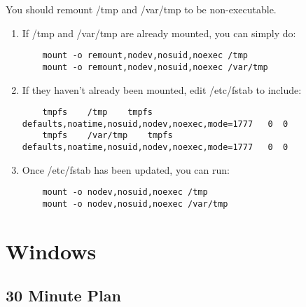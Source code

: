\documentclass[12pt,letterpaper]{article}
\begin{document}
You should remount /tmp and /var/tmp to be non-executable.
\begin{enumerate}
	\item If /tmp and /var/tmp are already mounted, you can simply do:
	\begin{verbatim}
	mount -o remount,nodev,nosuid,noexec /tmp
	mount -o remount,nodev,nosuid,noexec /var/tmp
	\end{verbatim}
	\item If they haven't already been mounted, edit /etc/fstab to include:
	\begin{verbatim}
	tmpfs    /tmp    tmpfs    defaults,noatime,nosuid,nodev,noexec,mode=1777   0  0
	tmpfs    /var/tmp    tmpfs    defaults,noatime,nosuid,nodev,noexec,mode=1777   0  0
	\end{verbatim}
	\item Once /etc/fstab has been updated, you can run:
	\begin{verbatim}
	mount -o nodev,nosuid,noexec /tmp
	mount -o nodev,nosuid,noexec /var/tmp
	\end{verbatim}
\end{enumerate}

\pagebreak

\section{Windows}

\subsection{30 Minute Plan}
\end{document}
